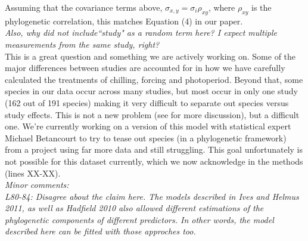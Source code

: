 \documentclass[11pt]{article}
\begin{document}
Assuming that the covariance terms above, $\sigma_{x,y}=\sigma_i \rho_{xy}$, where $\rho_{xy}$ is the phylogenetic correlation, this matches Equation (4) in our paper.\\

\emph{Also, why did not include``study" as a random term here? I expect multiple measurements from the same study, right?}\\

This is a great question and something we are actively working on. Some of the major differences between studies are accounted for in how we have carefully calculated the treatments of chilling, forcing and photoperiod. Beyond that, some species in our data occur across many studies, but most occur in only one study (162 out of 191 species) making it very difficult to separate out species versus study effects. This is not a new problem (see \cite{kharouba2018} for more discussion), but a difficult one. We're currently working on a version of this model with statistical expert Michael Betancourt to try to tease out species (in a phylogenetic framework) from a project using far more data and still struggling. This goal unfortunately is not possible for this dataset currently, which we now acknowledge in the methods (lines XX-XX). \\



\emph{Minor comments:}\\
\emph{L80-84: Disagree about the claim here. The models described in Ives and Helmus 2011, as well as Hadfield 2010 also allowed different estimations of the phylogenetic components of different predictors. In other words, the model described here can be fitted with those approches too.}\\
\end{document}
